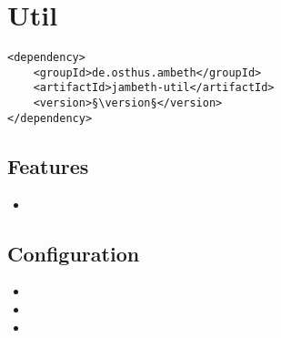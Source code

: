 \section{Util}
\label{module:Util}
\ClearAPI
\TODO
\begin{lstlisting}[style=POM,caption={Maven modules to use \emph{Ambeth Util}}]
<dependency>
	<groupId>de.osthus.ambeth</groupId>
	<artifactId>jambeth-util</artifactId>
	<version>§\version§</version>
</dependency>
\end{lstlisting}
\subsection{Features}
\begin{itemize}
	\item \TODO
\end{itemize}

\subsection{Configuration}
\begin{itemize}
	\item {}
	\item {}
	\item {}
\end{itemize}
